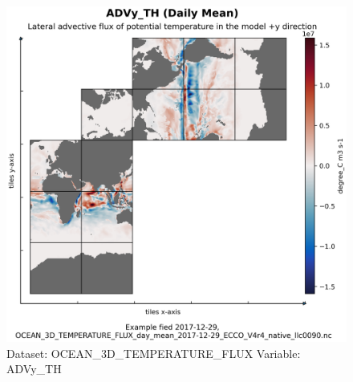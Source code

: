 \begin{figure}[H]
\centering
\includegraphics[scale=0.55]{../images/plots/native_plots/Ocean_Three-Dimensional_Potential_Temperature_Fluxes/ADVy_TH.png}
\caption{Dataset: OCEAN\_3D\_TEMPERATURE\_FLUX Variable: ADVy\_TH}
\label{tab:table-OCEAN_3D_TEMPERATURE_FLUX_ADVy_TH-Plot}
\end{figure}
\pagebreak
